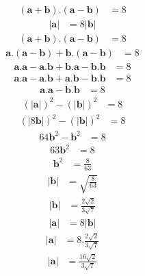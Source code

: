 \documentclass[10pt]{article}
\providecommand{\abs}[1]{\left\vert#1\right\vert}
\let\vec\mathbf{}
\begin{document}
\begin{enumerate}
\begin{align}
(\vec{a}+\vec{b}).(\vec{a}-\vec{b})&=8
\end{align}
\begin{align}
\abs{\vec{a}}&=8\abs{\vec{b}}
\end{align}
\begin{align}
(\vec{a}+\vec{b}).(\vec{a}-\vec{b})&=8
\end{align}
\begin{align}
\vec{a}.(\vec{a}-\vec{b})+\vec{b}.(\vec{a}-\vec{b})&=8
\end{align}
\begin{align}
\vec{a}.\vec{a}-\vec{a}.\vec{b}+\vec{b}.\vec{a}-\vec{b}.\vec{b}&=8
\end{align}
\begin{align}
\vec{a}.\vec{a}-\vec{a}.\vec{b}+\vec{a}.\vec{b}-\vec{b}.\vec{b}&=8
\end{align}
\begin{align}
\vec{a}.\vec{a}-\vec{b}.\vec{b}&=8
\end{align}
\begin{align}
(\abs{\vec{a}})^2-(\abs{\vec{b}})^2&=8
\end{align}
\begin{align}
(\abs{8\vec{b}})^2-(\abs{\vec{b}})^2&=8
\end{align}
\begin{align}
64{\vec{b}}^2-\vec{b}^2&=8
\end{align}
\begin{align}
63{\vec{b}}^2&=8
\end{align}
\begin{align}
\vec{b}^2&=\frac{8}{63}
\end{align}
\begin{align}
\abs{\vec{b}}&=\sqrt{\frac{8}{63}}
\end{align}
\begin{align}
\abs{\vec{b}}&=\frac{2\sqrt{2}}{3\sqrt{7}}
\end{align}
\begin{align}
\abs{\vec{a}}&=8\abs{\vec{b}}
\end{align}
\begin{align}
\abs{\vec{a}}&=8.\frac{2\sqrt{2}}{3\sqrt{7}}
\end{align}
\begin{align}
\abs{\vec{a}}&=\frac{16\sqrt{2}}{3\sqrt{7}}
\end{align}
\end{enumerate}
\end{document}
